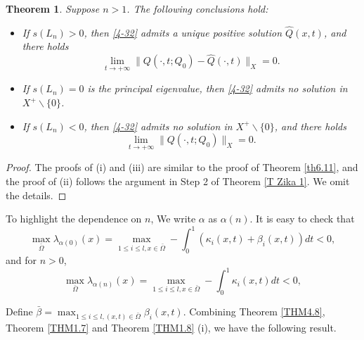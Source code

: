 \documentclass[11pt,reqno]{amsart}
\newtheorem{theorem}{Theorem}[section]
\numberwithin{equation}{section}
\begin{document}
\begin{theorem}\label{THM4.9}
Suppose $n>1$. The following conclusions hold:
\begin{itemize}[leftmargin=0.9cm]
\item[(i)] If $s(L_{n}) >0$, then \eqref{4-32} admits a unique positive solution $\hat{Q}(x,t)$, and there holds
\begin{equation*}
\lim\limits_{t\to+\infty} \| Q(\cdot,t;Q_{0}) - \hat{Q}(\cdot,t)\|_{X} = 0.
\end{equation*}

\item[(ii)] If $s(L_{n}) = 0$ is the principal eigenvalue, then \eqref{4-32} admits no solution in $X^{+}\backslash \{ 0\}$.


\item[(iii)] If $s(L_{n}) < 0$, then \eqref{4-32} admits no solution in $X^{+}\backslash \{ 0\}$, and there holds
\begin{equation}\label{4-35}
\lim\limits_{t\to+\infty} \| Q(\cdot,t;Q_{0}) \|_{X} = 0.
\end{equation}

\end{itemize}
\end{theorem}
\begin{proof}
The proofs of (i) and (iii) are similar to the proof of Theorem \ref{th6.11}, and the proof of (ii) follows the argument in
Step 2 of Theorem \ref{T Zika 1}. We omit the details.
\end{proof}



To highlight the dependence on $n$,
We write $\alpha$ as $\alpha(n)$.
It is easy to check that
\begin{equation*}
\max_{\bar{\Omega}}\lambda_{\alpha(0)}(x)= \max_{1\le i\le l,x\in\bar{\Omega}} - \int_{0}^{1} \left( \kappa_{i}(x,t) + \beta_{i}(x,t) \right) dt < 0,
\end{equation*}
and for $n>0$,
\begin{equation*}
\max_{\bar{\Omega}}\lambda_{\alpha(n)}(x)= \max_{1 \leq i\leq l,x\in\bar{\Omega}} - \int_{0}^{1} \kappa_{i}(x,t) dt < 0,
\end{equation*}

Define $\bar{\beta} = \max_{1\le i\le l,(x,t)\in\bar{\Omega}} \beta_{i}(x,t)$.
Combining Theorem \ref{THM4.8}, Theorem \ref{THM1.7} and Theorem \ref{THM1.8} (i), we have the following result.
\end{document}
